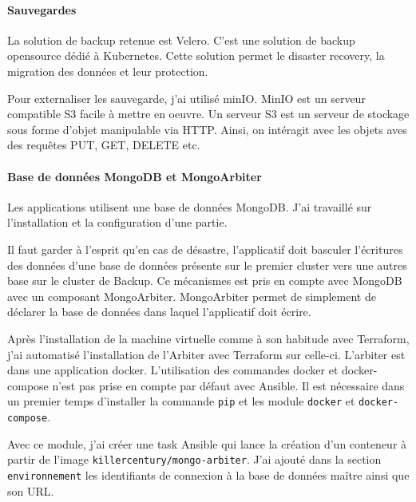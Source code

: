 \documentclass[12pt]{article}
\begin{document}
\paragraph{Sauvegardes}
La solution de backup retenue est Velero.
C'est une solution de backup opensource dédié à \gls{Kubernetes}.
Cette solution permet le disaster recovery, la migration des données et leur protection.

Pour externaliser les sauvegarde, j'ai utilisé minIO.
MinIO est un serveur compatible S3 facile à mettre en oeuvre.
Un serveur S3 est un serveur de stockage sous forme d'objet manipulable via HTTP.
Ainsi, on intéragit avec les objets aves des requêtes PUT, GET, DELETE etc.

\paragraph{Base de données MongoDB et MongoArbiter}
Les applications utilisent une base de données MongoDB.
J'ai travaillé sur l'installation et la configuration d'une partie.

Il faut garder à l'esprit qu'en cas de désastre, l'applicatif doit basculer l'écritures des données d'une base de données présente sur le premier \gls{cluster} vers une autres base sur le \gls{cluster} de Backup.
Ce mécanismes est pris en compte avec MongoDB avec un composant MongoArbiter.
MongoArbiter permet de simplement de déclarer la base de données dans laquel l'applicatif doit écrire.

Après l'installation de la machine virtuelle comme à son habitude avec Terraform, j'ai automatisé l'installation de l'Arbiter avec Terraform sur celle-ci.
L'arbiter est dans une application docker.
L'utilisation des commandes docker et docker-compose n'est pas prise en compte par défaut avec \gls{Ansible}.
Il est nécessaire dans un premier temps d'installer la commande \verb|pip| et les module \verb|docker| et \verb|docker-compose|.

Avec ce module, j'ai créer une task \gls{Ansible} qui lance la création d'un conteneur à partir de l'image \verb|killercentury/mongo-arbiter|.
J'ai ajouté dans la section \verb|environnement| les identifiants de connexion à la base de données maître ainsi que son URL.

\newpage
\end{document}
